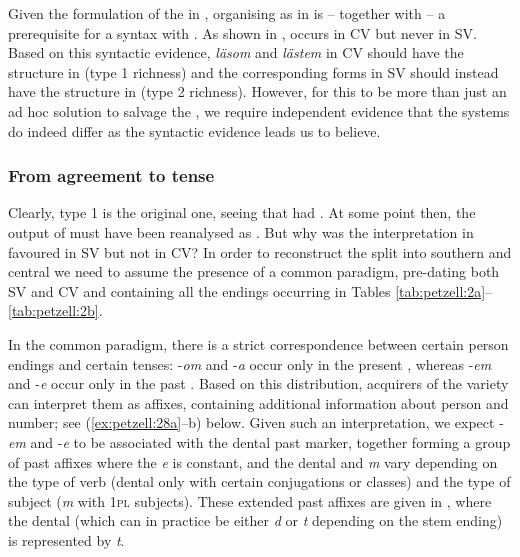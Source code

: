 \documentclass[output=paper,colorlinks,citecolor=brown,draft,draftmode]{langscibook}
\begin{document}
Given the formulation of the  in , organising  as in  is – together with  – a prerequisite for a syntax with . As shown in ,  occurs in CV but never in SV. Based on this syntactic evidence, \textit{läsom} and \textit{lästem} in CV should have the structure in  (type 1 richness) and the corresponding forms in SV should instead have the structure in  (type 2 richness). However, for this to be more than just an ad hoc solution to salvage the , we require independent evidence that the  systems do indeed differ as the syntactic evidence leads us to believe.


\subsubsection{From agreement to tense}\label{sec:petzell:4.3.2}\largerpage


Clearly, type 1  is the original one, seeing that  had . At some point then, the output of  must have been reanalysed as . But why was the interpretation in  favoured in SV but not in CV? In order to reconstruct the split into southern and central  we need to assume the presence of a common paradigm, pre-dating both SV and CV and containing all the endings occurring in Tables \ref{tab:petzell:2a}–\ref{tab:petzell:2b}.



In the common  paradigm, there is a strict correspondence between certain person endings and certain tenses: -\textit{om} and -\textit{a} occur only in the present , whereas -\textit{em} and -\textit{e} occur only in the past . Based on this distribution, acquirers of the variety can interpret them as  affixes, containing additional information about person and number; see (\ref{ex:petzell:28a}–b) below. Given such an interpretation, we expect -\textit{em} and -\textit{e} to be associated with the dental past  marker, together forming a group of past  affixes where the \textit{e} is constant, and the dental and \textit{m} vary depending on the type of verb (dental only with certain conjugations or classes) and the type of subject (\textit{m} with 1\textsc{pl} subjects). These extended past  affixes are given in , where the dental (which can in practice be either \textit{d} or \textit{t} depending on the stem ending) is represented by \textit{t}.
\end{document}
